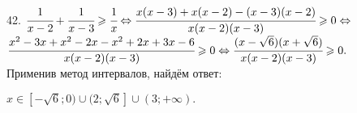 42. $\cfrac{1}{x-2}+\cfrac{1}{x-3}\geqslant\cfrac{1}{x}\Leftrightarrow \cfrac{x(x-3)+x(x-2)-(x-3)(x-2)}{x(x-2)(x-3)}\geqslant0\Leftrightarrow$\\$
\cfrac{x^2-3x+x^2-2x-x^2+2x+3x-6}{x(x-2)(x-3)}\geqslant0\Leftrightarrow\cfrac{(x-\sqrt{6})(x+\sqrt{6})}{x(x-2)(x-3)}\geqslant0.$\\ Применив метод интервалов, найдём ответ:
\begin{figure}[ht!]
\end{figure}
$x\in[-\sqrt{6};0)\cup(2;\sqrt{6}]\cup(3;+\infty).$\\
